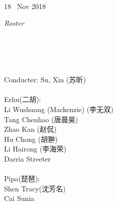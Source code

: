 \documentclass[letter,6pt,poets]{ConcProg}
\begin{document}
\begin{spacing}{1.0}
\begin{programme}{
\\  {\normalsize 18 ~Nov 2018}
}
\begin{part}[]
%

  \end{part}
  
  
\end{programme}

\begin{center}
\Large\textsl{ Roster}
\end{center}

\begin{multicols}{2}%

\\
\\
\\

\\
Conducter: Su, Xin  (苏昕)
\\
\\
 Erhu(二胡):                 \\
Li Wushuang (Mackenzie) (李无双)   \\
Tang Chenhao  (唐晨昊) \\
Zhao Kan (赵侃)\\
Hu Chong (胡翀)\\
Li Hairong (李海荣)\\
Darria Streeter\\
\\
Pipa(琵琶):\\
Shen Tracy(沈芳名)\\
Cai Sunia\\


\end{multicols}
\end{spacing}
\end{document}

